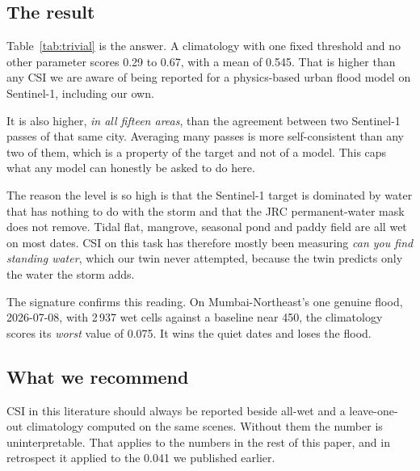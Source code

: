 \subsection{The result}
Table~\ref{tab:trivial} is the answer. A climatology with one fixed threshold and no other
parameter scores 0.29 to 0.67, with a mean of 0.545. That is higher than any CSI we are aware of
being reported for a physics-based urban flood model on Sentinel-1, including our own.

It is also higher, \emph{in all fifteen areas}, than the agreement between two Sentinel-1 passes of
that same city. Averaging many passes is more self-consistent than any two of them, which is a
property of the target and not of a model. This caps what any model can honestly be asked to do
here.

The reason the level is so high is that the Sentinel-1 target is dominated by water that has
nothing to do with the storm and that the JRC permanent-water mask does not remove. Tidal flat,
mangrove, seasonal pond and paddy field are all wet on most dates. CSI on this task has therefore
mostly been measuring \emph{can you find standing water}, which our twin never attempted, because
the twin predicts only the water the storm adds.

The signature confirms this reading. On Mumbai-Northeast's one genuine flood, 2026-07-08, with
2\,937 wet cells against a baseline near 450, the climatology scores its \emph{worst} value of
0.075. It wins the quiet dates and loses the flood.

\subsection{What we recommend}
CSI in this literature should always be reported beside all-wet and a leave-one-out climatology
computed on the same scenes. Without them the number is uninterpretable. That applies to the
numbers in the rest of this paper, and in retrospect it applied to the 0.041 we published earlier.
